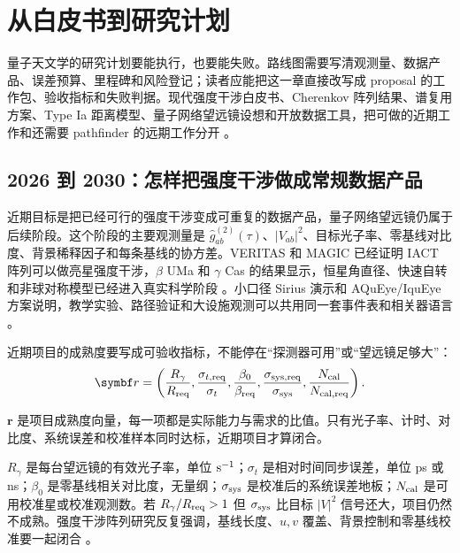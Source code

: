 \chapter{从白皮书到研究计划}
\label{chap:22}

\begin{chapteropening}
量子天文学的研究计划要能执行，也要能失败。路线图需要写清观测量、数据产品、误差预算、里程碑和风险登记；读者应能把这一章直接改写成 proposal 的工作包、验收指标和失败判据。现代强度干涉白皮书、Cherenkov 阵列结果、谱复用方案、Type Ia 距离模型、量子网络望远镜设想和开放数据工具，把可做的近期工作和还需要 pathfinder 的远期工作分开 \citep{1956Natur.178.1046H,1974iiia.book.....H,2003RPPh...66..789M,2018SPIE10548E..1KO,2026arXiv260212717K,2017ICRC...35..828K,2019ICRC...36..714K,2020NatAs...4.1164A,2024MNRAS.529.4387A,2025PhRvD.111h3047K,2023PhRvL.130p0801M,2026PhRvA.113a2608P}。
\end{chapteropening}

\section{2026 到 2030：怎样把强度干涉做成常规数据产品}

近期目标是把已经可行的强度干涉变成可重复的数据产品，量子网络望远镜仍属于后续阶段。这个阶段的主要观测量是 \(\hat g^{(2)}_{ab}(\tau)\)、\(|V_{ab}|^2\)、目标光子率、零基线对比度、背景稀释因子和每条基线的协方差。VERITAS 和 MAGIC 已经证明 IACT 阵列可以做亮星强度干涉，\(\beta\) UMa 和 \(\gamma\) Cas 的结果显示，恒星角直径、快速自转和非球对称模型已经进入真实科学阶段 \citep{2020NatAs...4.1164A,2024MNRAS.529.4387A,2024ApJ...966...28A,2025ApJ...995..191A}。小口径 Sirius 演示和 AQuEye/IquEye 方案说明，教学实验、路径验证和大设施观测可以共用同一套事件表和相关器语言 \citep{2016SPIE.9907E..0NZ,2025MNRAS.537.2527M}。

近期项目的成熟度要写成可验收指标，不能停在“探测器可用”或“望远镜足够大”：
\begin{equation}
  \bm{r}=
  \left(
  \frac{R_\gamma}{R_{\rm req}},
  \frac{\sigma_{t,{\rm req}}}{\sigma_t},
  \frac{\beta_0}{\beta_{\rm req}},
  \frac{\sigma_{{\rm sys,req}}}{\sigma_{\rm sys}},
  \frac{N_{\rm cal}}{N_{{\rm cal,req}}}
  \right).
  \label{eq:ch22-readiness-vector}
\end{equation}
\begin{formulaexplain}[公式 (22.1) 解读]
\(\bm r\) 是项目成熟度向量，每一项都是实际能力与需求的比值。只有光子率、计时、对比度、系统误差和校准样本同时达标，近期项目才算闭合。
\end{formulaexplain}
\(R_\gamma\) 是每台望远镜的有效光子率，单位 \({\rm s}^{-1}\)；\(\sigma_t\) 是相对时间同步误差，单位 ps 或 ns；\(\beta_0\) 是零基线相关对比度，无量纲；\(\sigma_{\rm sys}\) 是校准后的系统误差地板；\(N_{\rm cal}\) 是可用校准星或校准观测数。若 \(R_\gamma/R_{\rm req}>1\) 但 \(\sigma_{\rm sys}\) 比目标 \(|V|^2\) 信号还大，项目仍然不成熟。强度干涉阵列研究反复强调，基线长度、\(u,v\) 覆盖、背景控制和零基线校准要一起闭合 \citep{2006ApJ...649..399L,2013APh....43..331D,2022MNRAS.512.1722K}。

